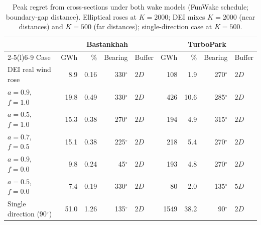 \documentclass[wes, manuscript]{copernicus}
\begin{document}
\begin{table}[htbp]
    \centering
    \caption{Peak regret from cross-sections under both wake models (FunWake schedule; boundary-gap distance).
    Elliptical roses at $K = 2000$; DEI mixes $K = 2000$ (near distances) and $K = 500$ (far distances); single-direction case at $K = 500$.}
    \label{tab:cross-section}
    \begin{tabular}{lrrrl@{\hskip 8mm}rrrl}
        \toprule
        & \multicolumn{4}{c}{Bastankhah} & \multicolumn{4}{c}{TurboPark} \\
        \cmidrule(r){2-5}\cmidrule(l){6-9}
        Case & GWh & \% & Bearing & Buffer & GWh & \% & Bearing & Buffer \\
        \midrule
        DEI real wind rose    &  8.9 & 0.16 & 330$^\circ$ & $2D$ &  108 &  1.9 & 270$^\circ$ & $2D$ \\
        $a = 0.9$, $f = 1.0$ & 19.8 & 0.49 & 330$^\circ$ & $2D$ &  426 & 10.6 & 285$^\circ$ & $2D$ \\
        $a = 0.5$, $f = 1.0$ & 15.3 & 0.38 & 270$^\circ$ & $2D$ &  194 &  4.9 & 315$^\circ$ & $2D$ \\
        $a = 0.7$, $f = 0.5$ & 15.1 & 0.38 & 225$^\circ$ & $2D$ &  218 &  5.4 & 270$^\circ$ & $2D$ \\
        $a = 0.9$, $f = 0.0$ &  9.8 & 0.24 &  45$^\circ$ & $2D$ &  193 &  4.8 & 270$^\circ$ & $2D$ \\
        $a = 0.5$, $f = 0.0$ &  7.4 & 0.19 & 330$^\circ$ & $2D$ &   80 &  2.0 & 135$^\circ$ & $5D$ \\
        Single direction (90$^\circ$) & 51.0 & 1.26 & 135$^\circ$ & $2D$ & 1549 & 38.2 & 90$^\circ$ & $2D$ \\
        \bottomrule
    \end{tabular}
\end{table}
\end{document}
